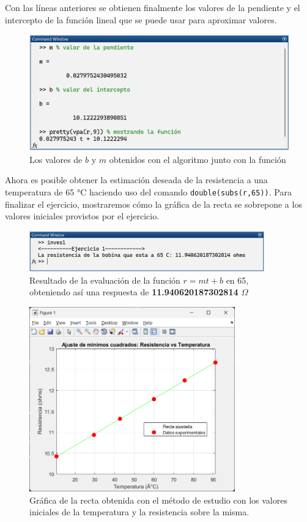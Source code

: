 \documentclass[11pt,letterpaper]{article}
\begin{document}
Con las líneas anteriores se obtienen finalmente los valores de la pendiente y el intercepto de la función lineal que se puede usar para aproximar valores. 
\begin{figure}[H]
\centering
\includegraphics[width=4.5in]{eq1.png}
\caption{Los valores de $b$ y $m$ obtenidos con el algoritmo junto con la función}
\label{figure:lineal1} 
\end{figure}
Ahora es posible obtener la estimación deseada de la resistencia a una temperatura de 65 °C haciendo uso del comando \texttt{double(subs(r,65))}. Para finalizar el ejercicio, mostraremos cómo la gráfica de la recta se sobrepone a los valores iniciales provistos por el ejercicio. 
\begin{figure}[H]
\centering
\includegraphics[width=4in]{res1.png}
\caption{Resultado de la evaluación de la función $r=mt + b$ en 65, obteniendo así una respuesta de \textbf{11.940620187302814 $\Omega$}}
\label{figure:res1}
\end{figure}
\begin{figure}[H]
\centering
\includegraphics[width=3.5in]{recta.png}
\caption{Gráfica de la recta obtenida con el método de estudio con los valores iniciales de la temperatura y la resistencia sobre la misma. }
\label{figure:recta1}
\end{figure}
\end{document}
